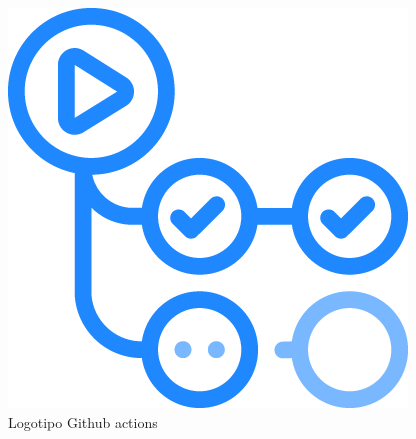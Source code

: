 \documentclass[11pt,spanish,listoffigures,listoftables]{tfgetsinf}
\begin{document}
\begin{figure}[!htb]
 \includegraphics[width=\linewidth]{img/GithubActions-logo.png}
 \caption{Logotipo Github actions}\label{fig:LogoGithub}
\endminipage
\end{figure}
\end{document}
